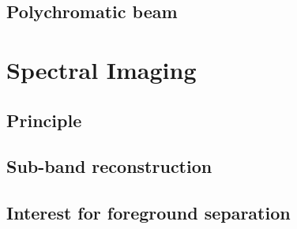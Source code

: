 \documentclass[../../thesis.tex]{subfiles}
\begin{document}
\subsection{Polychromatic beam}

\section{Spectral Imaging}

\subsection{Principle}

\subsection{Sub-band reconstruction}

\subsection{Interest for foreground separation}
\end{document}
